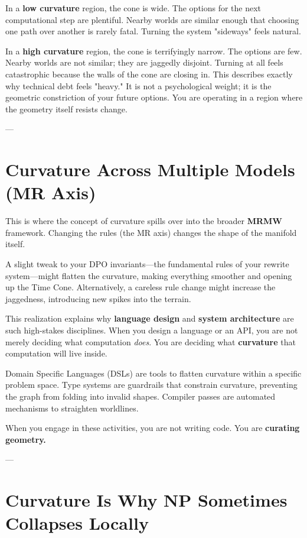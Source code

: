 In a \textbf{low curvature} region, the cone is wide. The options for the next computational step are plentiful. Nearby worlds are similar enough that choosing one path over another is rarely fatal. Turning the system "sideways" feels natural.

In a \textbf{high curvature} region, the cone is terrifyingly narrow. The options are few. Nearby worlds are not similar; they are jaggedly disjoint. Turning at all feels catastrophic because the walls of the cone are closing in. This describes exactly why technical debt feels "heavy." It is not a psychological weight; it is the geometric constriction of your future options. You are operating in a region where the geometry itself resists change.

---

\section{\texorpdfstring{\textbf{Curvature Across Multiple Models (MR Axis)}}{9.6 --- Curvature Across Multiple Models (MR Axis)}}

This is where the concept of curvature spills over into the broader \textbf{MRMW} framework. Changing the rules (the MR axis) changes the shape of the manifold itself.

A slight tweak to your DPO invariants—the fundamental rules of your rewrite system—might flatten the curvature, making everything smoother and opening up the Time Cone. Alternatively, a careless rule change might increase the jaggedness, introducing new spikes into the terrain.

This realization explains why \textbf{language design} and \textbf{system architecture} are such high-stakes disciplines. When you design a language or an API, you are not merely deciding what computation \textit{does}. You are deciding what \textbf{curvature} that computation will live inside.

Domain Specific Languages (DSLs) are tools to flatten curvature within a specific problem space. Type systems are guardrails that constrain curvature, preventing the graph from folding into invalid shapes. Compiler passes are automated mechanisms to straighten worldlines.

When you engage in these activities, you are not writing code. You are \textbf{curating geometry.}

---

\section{\texorpdfstring{\textbf{Curvature Is Why NP Sometimes Collapses Locally}}{9.7 --- Curvature Is Why NP Sometimes Collapses Locally}}


